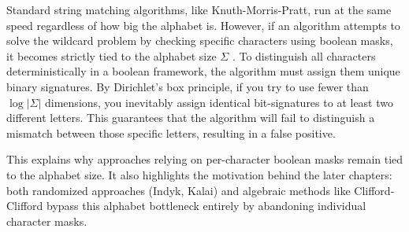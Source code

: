 Standard string matching algorithms, like Knuth-Morris-Pratt, run at the same speed regardless of how big the alphabet is. However, if an algorithm attempts to solve the wildcard problem by checking specific characters using boolean masks, it becomes strictly tied to the alphabet size $\Sigma$ \cite{mp1994}.  To distinguish all characters deterministically in a boolean framework, the algorithm must assign them unique binary signatures. By Dirichlet's box principle, if you try to use fewer than $\log |\Sigma|$ dimensions, you inevitably assign identical bit-signatures to at least two different letters. This guarantees that the algorithm will fail to distinguish a mismatch between those specific letters, resulting in a false positive.

This explains why approaches relying on per-character boolean masks remain tied to the alphabet size. It also highlights the motivation behind the later chapters: both randomized approaches (Indyk, Kalai) and algebraic methods like Clifford-Clifford bypass this alphabet bottleneck entirely by abandoning individual character masks.